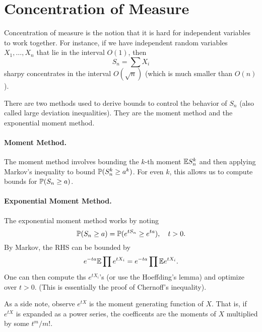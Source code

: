 \section*{Concentration of Measure}

Concentration of measure is the notion that it is hard for independent variables to work together. For instance, if we have independent random variables $X_1, \dots, X_n$ that lie in the interval $O(1)$, then
\[
    S_n = \sum X_i
\]
sharpy concentrates in the interval $O(\sqrt{n})$ (which is much smaller than $O(n)$).

There are two methods used to derive bounds to control the behavior of $S_n$ (also called large deviation inequalities). They are the moment method and the exponential moment method.

\paragraph{Moment Method.} The moment method involves bounding the $k$-th moment ${\mathbb E} S_n^k$ and then applying Markov's inequality to bound ${\mathbb P}(S_n^k \geq a^k)$. For even $k$, this allows us to compute bounds for ${\mathbb P}(S_n \geq a)$.

\paragraph{Exponential Moment Method.} The exponential moment method works by noting
\[
    {\mathbb P}(S_n \geq a) = {\mathbb P}( e^{tS_n} \geq e^{ta}), \quad t > 0.
\]
By Markov, the RHS can be bounded by
\[
    e^{-ta} {\mathbb E} \prod e^{tX_i} = e^{-ta} \prod {\mathbb E} e^{tX_i}.
\]
One can then compute ths $e^{tX_i}$'s (or use the Hoeffding's lemma) and optimize over $t > 0$. (This is essentially the proof of Chernoff's inequality).

As a side note, observe $e^{tX}$ is the moment generating function of $X$. That is, if $e^{tX}$ is expanded as a power series, the coefficents are the moments of $X$ multiplied by some $t^m/m!$.